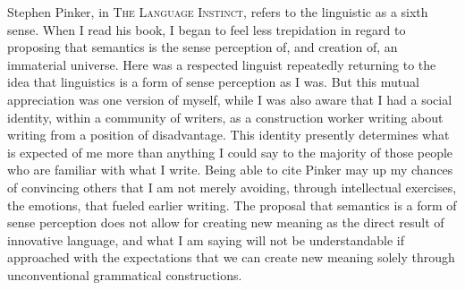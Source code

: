 \documentclass[
]{memoir}
\begin{document}
Stephen Pinker, in \textsc{The Language Instinct}, refers to the
linguistic as a sixth sense. When I read his book, I began to feel less
trepidation in regard to proposing that semantics is the sense
perception of, and creation of, an immaterial universe. Here was a
respected linguist repeatedly returning to the idea that linguistics is
a form of sense perception as I was. But this mutual appreciation was
one version of myself, while I was also aware that I had a social
identity, within a community of writers, as a construction worker
writing about writing from a position of disadvantage. This identity
presently determines what is expected of me more than anything I could
say to the majority of those people who are familiar with what I write.
Being able to cite Pinker may up my chances of convincing others that I
am not merely avoiding, through intellectual exercises, the emotions,
that fueled earlier writing. The proposal that semantics is a form of
sense perception does not allow for creating new meaning as the direct
result of innovative language, and what I am saying will not be
understandable if approached with the expectations that we can create
new meaning solely through unconventional grammatical constructions.
\end{document}
